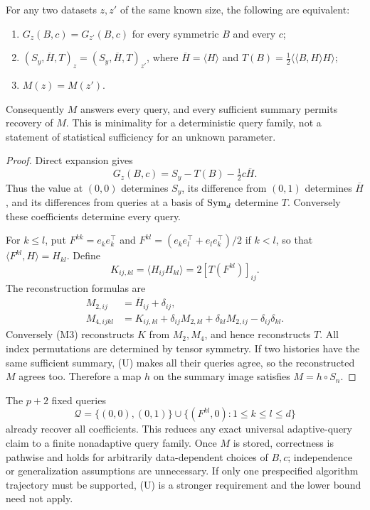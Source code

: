 \begin{theorem}
\label{thm:memory-canonical}
For any two datasets $z,z'$ of the same known size, the following are
equivalent:
\begin{enumerate}
 \item $G_z(B,c)=G_{z'}(B,c)$ for every symmetric $B$ and every $c$;
 \item $(S_y,\overline H,T)_z=(S_y,\overline H,T)_{z'}$, where
 $\overline H=\langle H\rangle$ and
 $T(B)=\tfrac12\langle\langle B,H\rangle H\rangle$;
 \item $M(z)=M(z')$.
\end{enumerate}
Consequently $M$ answers every query, and every sufficient summary
permits recovery of $M$. This is minimality for a deterministic
query family, not a statement of statistical sufficiency for an unknown
parameter.
\end{theorem}
\begin{proof}
Direct expansion gives
\[
 G_z(B,c)=S_y-T(B)-\tfrac12c\overline H. \tag{M1}
\]
Thus the value at $(0,0)$ determines $S_y$, its difference from $(0,1)$
determines $\overline H$, and its differences from queries at a basis of
$\operatorname{Sym}_d$ determine $T$. Conversely these coefficients determine every
query.

For $k\le l$, put $F^{kk}=e_ke_k^\top$ and
$F^{kl}=(e_ke_l^\top+e_le_k^\top)/2$ if $k<l$, so that
$\langle F^{kl},H\rangle=H_{kl}$. Define
\[
 K_{ij,kl}=\langle H_{ij}H_{kl}\rangle
             =2[T(F^{kl})]_{ij}.
\]
The reconstruction formulas are
\begin{align}
 M_{2,ij}&=\overline H_{ij}+\delta_{ij},\tag{M2}\\
 M_{4,ijkl}&=K_{ij,kl}
       +\delta_{ij}M_{2,kl}+\delta_{kl}M_{2,ij}
       -\delta_{ij}\delta_{kl}.\tag{M3}
\end{align}
Conversely (M3) reconstructs $K$ from $M_2,M_4$, and hence reconstructs
$T$. All index permutations are determined by tensor symmetry.
If two histories have the same sufficient summary, (U) makes all their
queries agree, so the reconstructed $M$ agrees too. Therefore a map
$h$ on the summary image satisfies $M=h\circ S_n$.
\end{proof}

The $p+2$ fixed queries
\[
 \mathcal Q=\{(0,0),(0,1)\}\cup
              \{(F^{kl},0):1\le k\le l\le d\}\tag{M4}
\]
already recover all coefficients. This reduces any exact universal
adaptive-query claim to a finite nonadaptive query family. Once $M$ is
stored, correctness is pathwise and holds for arbitrarily data-dependent
choices of $B,c$; independence or generalization assumptions are unnecessary.
If only one prespecified algorithm trajectory must be supported, (U)
is a stronger requirement and the lower bound need not apply.

